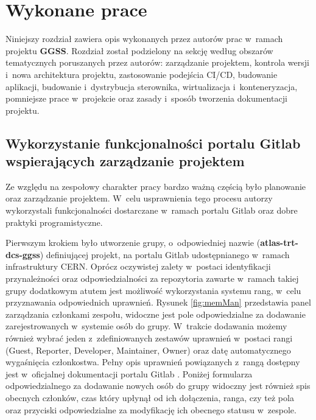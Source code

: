\chapter{Wykonane prace}
\label{cha:prace}

Niniejszy rozdział zawiera opis wykonanych przez autorów prac w~ramach projektu \textbf{GGSS}. Rozdział został podzielony na sekcję według obszarów tematycznych poruszanych przez autorów: zarządzanie projektem, kontrola wersji i~nowa architektura projektu, zastosowanie podejścia CI/CD, budowanie aplikacji, budowanie i~dystrybucja sterownika, wirtualizacja i~konteneryzacja, pomniejsze prace w~projekcie oraz zasady i~sposób tworzenia dokumentacji projektu.

\section{Wykorzystanie funkcjonalności portalu Gitlab wspierających zarządzanie projektem}

Ze względu na zespołowy charakter pracy bardzo ważną częścią było planowanie oraz zarządzanie projektem. W~celu usprawnienia tego procesu autorzy wykorzystali funkcjonalności dostarczane w~ramach portalu Gitlab oraz dobre praktyki programistyczne.

Pierwszym krokiem było utworzenie grupy, o~odpowiedniej nazwie (\textbf{atlas-trt-dcs-ggss}) definiującej projekt, na portalu Gitlab udostępnianego w~ramach infrastruktury CERN. Oprócz oczywistej zalety w~postaci identyfikacji przynależności oraz odpowiedzialności za repozytoria zawarte w~ramach takiej grupy dodatkowym atutem jest możliwość wykorzystania systemu rang, w~celu przyznawania odpowiednich uprawnień. Rysunek \ref{fig:memMan} przedstawia panel zarządzania członkami zespołu, widoczne jest pole odpowiedzialne za dodawanie zarejestrowanych w~systemie osób do grupy. W~trakcie dodawania możemy również wybrać jeden z~zdefiniowanych zestawów uprawnień w~postaci rangi (Guest, Reporter, Developer, Maintainer, Owner) oraz datę automatycznego wygaśnięcia członkostwa. Pełny opis uprawnień powiązanych z~rangą dostępny jest w~oficjalnej dokumentacji portalu Gitlab \cite{GitLabPermissions}. Poniżej formularza odpowiedzialnego za dodawanie nowych osób do grupy widoczny jest również spis obecnych członków, czas który upłynął od ich dołączenia, ranga, czy też pola oraz przyciski odpowiedzialne za modyfikację ich obecnego statusu w~zespole.

